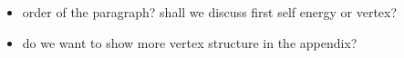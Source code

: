 \begin{itemize}
\item order of the paragraph? shall we discuss first self energy or vertex? 
\item do we want to show more vertex structure in the appendix? 
\end{itemize}